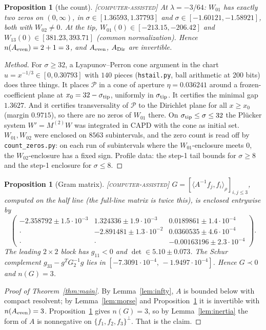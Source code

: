 \documentclass[11pt]{amsart}
\newtheorem{proposition}[theorem]{Proposition}
\theoremstyle{definition}
\theoremstyle{remark}
\newcommand{\ip}[2]{\langle #1,#2\rangle}
\newcommand{\lab}[1]{\textup{\textsc{[#1]}}}
\newcommand{\stip}{\sigma_{\rm tip}}
\begin{document}
\begin{proposition}[the count]\label{prop:count}\lab{computer-assisted}
At $\lambda=-3/64$: $W_{01}$ has exactly two zeros on $(0,\infty)$, in $\sigma\in[1.36593,1.37793]$ and $\sigma\in[-1.60121,-1.58921]$, both with $W_{02}\ne0$. At the tip, $W_{01}(0)\in[-213.15,-206.42]$ and $W_{13}(0)\in[381.23,393.71]$ (common normalization). Hence $n(A_{\rm even})=2+1=3$, and $A_{\rm even}$, $A_{\rm Dir}$ are invertible.
\end{proposition}
\begin{proof}[Method]
For $\sigma\ge32$, a Lyapunov--Perron cone argument in the chart $u=x^{-1/3}\in[0,0.30793]$ with $140$ pieces (\texttt{hstail.py}, ball arithmetic at 200 bits) does three things. It places $\mathcal P$ in a cone of aperture $\eta=0.036241$ around a frozen-coefficient plane at $x_0=32-\stip$, uniformly in $\stip$. It certifies the minimal gap $1.3627$. And it certifies transversality of $\mathcal P$ to the Dirichlet plane for all $x\ge x_0$ (margin $0.9715$), so there are no zeros of $W_{01}$ there. On $\stip\le\sigma\le32$ the Pl\"ucker system $W'=M^{(2)}W$ was integrated in CAPD with the cone as initial set. $W_{01},W_{02}$ were enclosed on $8563$ subintervals, and the zero count is read off by \texttt{count\_zeros.py}: on each run of subintervals where the $W_{01}$-enclosure meets $0$, the $W_{02}$-enclosure has a fixed sign. Profile data: the step-1 tail bounds for $\sigma\ge8$ and the step-1 enclosure for $\sigma\le8$.
\end{proof}

\begin{proposition}[Gram matrix]\label{prop:gram}\lab{computer-assisted}
$G=[\ip{A^{-1}f_j}{f_i}_\rho]_{i,j\le3}$, computed on the half line (the full-line matrix is twice this), is enclosed entrywise by
\[
\begin{pmatrix}
-2.358792\pm1.5\cdot10^{-3} & 1.324336\pm1.9\cdot10^{-3} & 0.0189861\pm1.4\cdot10^{-4}\\
\cdot & -2.891481\pm1.3\cdot10^{-2} & 0.0360535\pm4.6\cdot10^{-4}\\
\cdot & \cdot & -0.00163196\pm2.3\cdot10^{-4}
\end{pmatrix}.
\]
The leading $2\times2$ block has $g_{11}<0$ and $\det\in5.10\pm0.073$. The Schur complement $g_{33}-g^TG_2^{-1}g$ lies in $[-7.3091\cdot10^{-4},\,-1.9497\cdot10^{-4}]$. Hence $G\prec0$ and $n(G)=3$.
\end{proposition}

\begin{proof}[Proof of Theorem~\ref{thm:main}]
By Lemma~\ref{lem:infty}, $A$ is bounded below with compact resolvent; by Lemma~\ref{lem:morse} and Proposition~\ref{prop:count} it is invertible with $n(A_{\rm even})=3$. Proposition~\ref{prop:gram} gives $n(G)=3$, so by Lemma~\ref{lem:inertia} the form of $A$ is nonnegative on $\{f_1,f_2,f_3\}^\perp$. That is the claim.
\end{proof}
\end{document}
